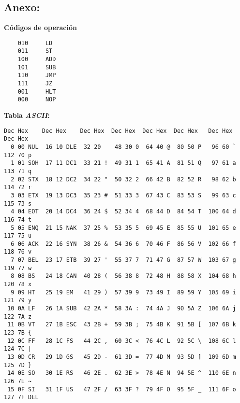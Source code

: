 \documentclass[12pt]{article}
\begin{document}
\subsection*{ \large\textbf{Anexo:} }

\textbf{Códigos de operación}

\begin{verbatim}
    010     LD
    011     ST
    100     ADD
    101     SUB
    110     JMP
    111     JZ
    001     HLT
    000     NOP
\end{verbatim}

\textbf{Tabla \emph{ASCII}:}

\begin{verbatim}
Dec Hex    Dec Hex    Dec Hex  Dec Hex  Dec Hex  Dec Hex   Dec Hex   Dec Hex
  0 00 NUL  16 10 DLE  32 20    48 30 0  64 40 @  80 50 P   96 60 `  112 70 p
  1 01 SOH  17 11 DC1  33 21 !  49 31 1  65 41 A  81 51 Q   97 61 a  113 71 q
  2 02 STX  18 12 DC2  34 22 "  50 32 2  66 42 B  82 52 R   98 62 b  114 72 r
  3 03 ETX  19 13 DC3  35 23 #  51 33 3  67 43 C  83 53 S   99 63 c  115 73 s
  4 04 EOT  20 14 DC4  36 24 $  52 34 4  68 44 D  84 54 T  100 64 d  116 74 t
  5 05 ENQ  21 15 NAK  37 25 %  53 35 5  69 45 E  85 55 U  101 65 e  117 75 u
  6 06 ACK  22 16 SYN  38 26 &  54 36 6  70 46 F  86 56 V  102 66 f  118 76 v
  7 07 BEL  23 17 ETB  39 27 '  55 37 7  71 47 G  87 57 W  103 67 g  119 77 w
  8 08 BS   24 18 CAN  40 28 (  56 38 8  72 48 H  88 58 X  104 68 h  120 78 x
  9 09 HT   25 19 EM   41 29 )  57 39 9  73 49 I  89 59 Y  105 69 i  121 79 y
 10 0A LF   26 1A SUB  42 2A *  58 3A :  74 4A J  90 5A Z  106 6A j  122 7A z
 11 0B VT   27 1B ESC  43 2B +  59 3B ;  75 4B K  91 5B [  107 6B k  123 7B {
 12 0C FF   28 1C FS   44 2C ,  60 3C <  76 4C L  92 5C \  108 6C l  124 7C |
 13 0D CR   29 1D GS   45 2D -  61 3D =  77 4D M  93 5D ]  109 6D m  125 7D }
 14 0E SO   30 1E RS   46 2E .  62 3E >  78 4E N  94 5E ^  110 6E n  126 7E ~
 15 0F SI   31 1F US   47 2F /  63 3F ?  79 4F O  95 5F _  111 6F o  127 7F DEL
\end{verbatim}
\end{document}
